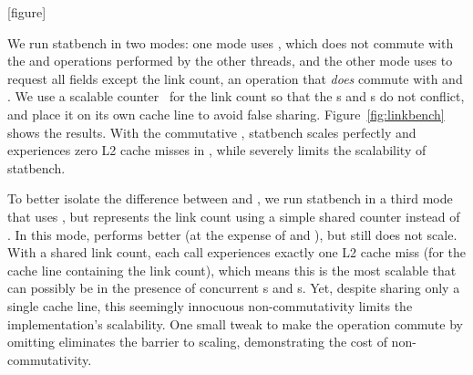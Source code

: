 
[figure]
\renewcommand{\themysubfigure}{\thefigure(\alph{mysubfigure})}


%   

We run statbench in two modes: one mode uses , which does
not commute with the  and  operations performed
by the other threads, and the other mode uses  to request
all fields except the link count, an operation that \emph{does} commute
with  and .  We use a  scalable
counter~\cite{clements:radixvm} for the link count so that the
s and s do not conflict, and place it on
its own cache line to avoid false sharing.
Figure~\ref{fig:linkbench} shows the results.  With the commutative
, statbench scales perfectly and experiences zero L2 cache
misses in , while  severely limits the
scalability of statbench.  

To better
isolate the difference between  and , we run
statbench in a
third mode that uses , but represents the link count
using a simple shared counter instead of .  In this mode, 
performs better (at the expense of  and ), but
still does not scale.  With a shared link count, each 
call experiences exactly one L2 cache miss (for the cache line
containing the link count), which means this is the most scalable that
 can possibly be in the presence of concurrent s
and s.  Yet, despite sharing only a single cache line, this
seemingly innocuous non-commutativity limits the
implementation's scalability.  One small tweak to make the operation
commute by omitting  eliminates the barrier to scaling,
demonstrating the cost of non-commutativity.

